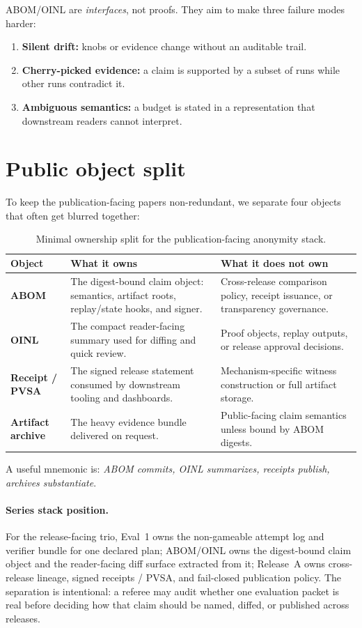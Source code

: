\documentclass[11pt]{article}
\begin{document}
ABOM/OINL are \emph{interfaces}, not proofs.
They aim to make three failure modes harder:
\begin{enumerate}[leftmargin=*]
\item \textbf{Silent drift:} knobs or evidence change without an auditable trail.
\item \textbf{Cherry-picked evidence:} a claim is supported by a subset of runs while other runs contradict it.
\item \textbf{Ambiguous semantics:} a budget is stated in a representation that downstream readers cannot interpret.
\end{enumerate}

\section{Public object split}
To keep the publication-facing papers non-redundant, we separate four objects that often get blurred together:
\begin{table}[t]
\centering
\small
\begin{tabular}{@{}p{2.3cm}p{4.7cm}p{4.9cm}@{}}
\toprule
\textbf{Object} & \textbf{What it owns} & \textbf{What it does not own}\\
\midrule
\textbf{ABOM} & The digest-bound claim object: semantics, artifact roots, replay/state hooks, and signer. & Cross-release comparison policy, receipt issuance, or transparency governance.\\
\addlinespace
\textbf{OINL} & The compact reader-facing summary used for diffing and quick review. & Proof objects, replay outputs, or release approval decisions.\\
\addlinespace
\textbf{Receipt / PVSA} & The signed release statement consumed by downstream tooling and dashboards. & Mechanism-specific witness construction or full artifact storage.\\
\addlinespace
\textbf{Artifact archive} & The heavy evidence bundle delivered on request. & Public-facing claim semantics unless bound by ABOM digests.\\
\bottomrule
\end{tabular}
\caption{Minimal ownership split for the publication-facing anonymity stack.}
\label{tab:object-split}
\end{table}
A useful mnemonic is: \emph{ABOM commits, OINL summarizes, receipts publish, archives substantiate}.

\paragraph{Series stack position.}
For the release-facing trio, Eval~1 owns the non-gameable attempt log and verifier bundle for one declared plan; ABOM/OINL owns the digest-bound claim object and the reader-facing diff surface extracted from it; Release~A owns cross-release lineage, signed receipts / PVSA, and fail-closed publication policy.\cite{series:evalnotary,series:releaseproperty}
The separation is intentional: a referee may audit whether one evaluation packet is real before deciding how that claim should be named, diffed, or published across releases.
\end{document}
